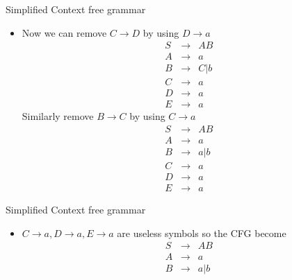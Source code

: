 \documentclass{beamer}
\begin{document}
\begin{frame}{Simplified Context free grammar}
	\small
	\begin{itemize}
		\item Now we can remove $C\rightarrow D$ by using $D\rightarrow a$ 
		\begin{eqnarray*}
			S&\rightarrow& AB\\
			A&\rightarrow& a\\
			B&\rightarrow&C|b\\
			C&\rightarrow&a\\
			D&\rightarrow&a\\
			E&\rightarrow&a
		\end{eqnarray*}
Similarly remove $B\rightarrow C$ by using $C\rightarrow a$ 
\begin{eqnarray*}
	S&\rightarrow& AB\\
	A&\rightarrow& a\\
	B&\rightarrow&a|b\\
	C&\rightarrow&a\\
	D&\rightarrow&a\\
	E&\rightarrow&a
\end{eqnarray*}
	\end{itemize}
\end{frame}
\begin{frame}{Simplified Context free grammar}
	\small
	\begin{itemize}
		\item 	$C\rightarrow a,	D\rightarrow a,	E\rightarrow a $ are useless symbols so the CFG become
		\begin{eqnarray*}
			S&\rightarrow& AB\\
			A&\rightarrow& a\\
			B&\rightarrow&a|b\\
		\end{eqnarray*}
	\end{itemize}
\end{frame}
\end{document}
